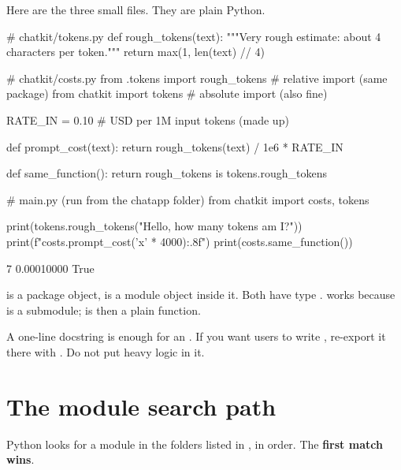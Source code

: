 Here are the three small files. They are plain Python.

\begin{pycode}
# chatkit/tokens.py
def rough_tokens(text):
    """Very rough estimate: about 4 characters per token."""
    return max(1, len(text) // 4)
\end{pycode}
\begin{pycode}
# chatkit/costs.py
from .tokens import rough_tokens      # relative import (same package)
from chatkit import tokens            # absolute import (also fine)

RATE_IN = 0.10  # USD per 1M input tokens (made up)

def prompt_cost(text):
    return rough_tokens(text) / 1e6 * RATE_IN

def same_function():
    return rough_tokens is tokens.rough_tokens
\end{pycode}
\begin{pycode}
# main.py  (run from the chatapp folder)
from chatkit import costs, tokens

print(tokens.rough_tokens("Hello, how many tokens am I?"))
print(f"{costs.prompt_cost('x' * 4000):.8f}")
print(costs.same_function())
\end{pycode}
\begin{rawcode}
7
0.00010000
True
\end{rawcode}

\begin{typecheck}
 is a package object,  is a module object inside it.
Both have type .  works because 
is a submodule;  is then a plain function.
\end{typecheck}

\begin{gamerule}
A one-line docstring is enough for an . If you want users to write
, re-export it there with
. Do not put heavy logic in it.
\end{gamerule}

\section{The module search path}

Python looks for a module in the folders listed in , in order. The
\textbf{first match wins}.

